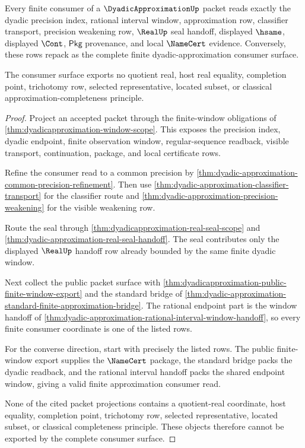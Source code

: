 \begin{theorem}\label{thm:dyadicapproximation-consumer-completeness}
Every finite consumer of a $\DyadicApproximationUp$ packet reads exactly the
dyadic precision index, rational interval window, approximation row,
classifier transport, precision weakening row, $\RealUp$ seal handoff,
displayed $\hsame$, displayed $\Cont$, $\mathsf{Pkg}$ provenance, and local
$\NameCert$ evidence. Conversely, these rows repack as the complete finite
dyadic-approximation consumer surface.

The consumer surface exports no quotient real, host real equality, completion
point, trichotomy row, selected representative, located subset, or classical
approximation-completeness principle.
\end{theorem}
\begin{proof}
Project an accepted packet through the finite-window obligations of
\autoref{thm:dyadicapproximation-window-scope}. This exposes the precision
index, dyadic endpoint, finite observation window, regular-sequence readback,
visible transport, continuation, package, and local certificate rows.

Refine the consumer read to a common precision by
\autoref{thm:dyadic-approximation-common-precision-refinement}. Then use
\autoref{thm:dyadic-approximation-classifier-transport} for the classifier
route and \autoref{thm:dyadic-approximation-precision-weakening} for the
visible weakening row.

Route the seal through \autoref{thm:dyadicapproximation-real-seal-scope} and
\autoref{thm:dyadic-approximation-real-seal-handoff}. The seal contributes
only the displayed $\RealUp$ handoff row already bounded by the same finite
dyadic window.

Next collect the public packet surface with
\autoref{thm:dyadicapproximation-public-finite-window-export} and the standard
bridge of
\autoref{thm:dyadic-approximation-standard-finite-approximation-bridge}. The
rational endpoint part is the window handoff of
\autoref{thm:dyadic-approximation-rational-interval-window-handoff}, so every
finite consumer coordinate is one of the listed rows.

For the converse direction, start with precisely the listed rows. The public
finite-window export supplies the $\NameCert$ package, the standard bridge
packs the dyadic readback, and the rational interval handoff packs the shared
endpoint window, giving a valid finite approximation consumer read.

None of the cited packet projections contains a quotient-real coordinate,
host equality, completion point, trichotomy row, selected representative,
located subset, or classical completeness principle. These objects therefore
cannot be exported by the complete consumer surface.
\end{proof}

